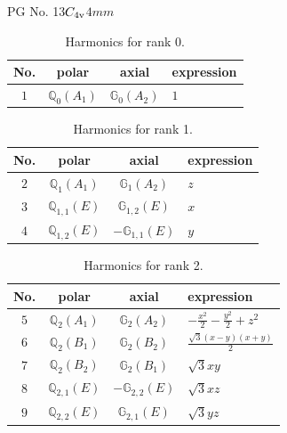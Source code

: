 \documentclass[fleqn,8pt,landscape]{jsarticle}
\begin{document}
\setcounter{MaxMatrixCols}{32}

\renewcommand{\tablename}{Table~}
\renewcommand{\figurename}{Figure~}
\begin{center}
\LARGE
PG No. 13\quad$C_{\rm 4v}$\quad$4mm$\quad[ tetragonal ]
\end{center}
\begin{table}[ht!]
\begin{center}
\caption{Harmonics for rank 0.}
\renewcommand{\arraystretch}{1.3}
\begin{tabular}{cccl} \hline \hline
No. & polar & axial & expression \\ \hline
$ 1 $ & $ \mathbb{Q}_{0}(A_{1}) $ & $ \mathbb{G}_{0}(A_{2}) $ & $ 1 $ \\
 \hline \hline
\end{tabular}
\end{center}
\end{table}
\begin{table}[ht!]
\begin{center}
\caption{Harmonics for rank 1.}
\renewcommand{\arraystretch}{1.3}
\begin{tabular}{cccl} \hline \hline
No. & polar & axial & expression \\ \hline
$ 2 $ & $ \mathbb{Q}_{1}(A_{1}) $ & $ \mathbb{G}_{1}(A_{2}) $ & $ z $ \\
$ 3 $ & $ \mathbb{Q}_{1,1}(E) $ & $ \mathbb{G}_{1,2}(E) $ & $ x $ \\
$ 4 $ & $ \mathbb{Q}_{1,2}(E) $ & $ -\mathbb{G}_{1,1}(E) $ & $ y $ \\
 \hline \hline
\end{tabular}
\end{center}
\end{table}
\begin{table}[ht!]
\begin{center}
\caption{Harmonics for rank 2.}
\renewcommand{\arraystretch}{1.3}
\begin{tabular}{cccl} \hline \hline
No. & polar & axial & expression \\ \hline
$ 5 $ & $ \mathbb{Q}_{2}(A_{1}) $ & $ \mathbb{G}_{2}(A_{2}) $ & $ - \frac{x^{2}}{2} - \frac{y^{2}}{2} + z^{2} $ \\
$ 6 $ & $ \mathbb{Q}_{2}(B_{1}) $ & $ \mathbb{G}_{2}(B_{2}) $ & $ \frac{\sqrt{3} \left(x - y\right) \left(x + y\right)}{2} $ \\
$ 7 $ & $ \mathbb{Q}_{2}(B_{2}) $ & $ \mathbb{G}_{2}(B_{1}) $ & $ \sqrt{3} x y $ \\
$ 8 $ & $ \mathbb{Q}_{2,1}(E) $ & $ -\mathbb{G}_{2,2}(E) $ & $ \sqrt{3} x z $ \\
$ 9 $ & $ \mathbb{Q}_{2,2}(E) $ & $ \mathbb{G}_{2,1}(E) $ & $ \sqrt{3} y z $ \\
 \hline \hline
\end{tabular}
\end{center}
\end{table}
\end{document}
